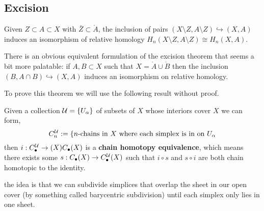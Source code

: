 \documentclass[a4paper]{article}
\begin{document}

\subsection{Excision}

\begin{theorem}[Excision]
    Given $Z\subset A \subset X$ with $\bar{Z}\subset \mathring{A}$, the inclusion of pairs $(X\setminus Z,A\setminus Z)\hookrightarrow (X,A)$ induces an isomorphism of relative homology $H_n(X\setminus Z,A\setminus Z)\cong H_n(X,A)$.
\end{theorem}
There is an obvious equivalent formulation of the excision theorem that seems a bit more palatable: if $A,B\subset X$ such that $X=\mathring{A}\cup\mathring{B}$ then the inclusion $(B,A\cap B)\hookrightarrow (X,A)$ induces an isomorphism on relative homology.

To prove this theorem we will use the following result without proof.
\begin{proposition}
    Given a collection $\mathcal{U}=\{U_\alpha\}$ of subsets of $X$ whose interiors cover $X$ we can form,\[
        C_n^{\mathcal{U}}:=\{\text{$n$-chains in  $X$ where each simplex is in on $U_\alpha$}
    \] then $i:C_\bullet^{\mathcal{U}}\rightarrow(X) C_\bullet(X)$ is a \textbf{chain homotopy equivalence}, which means there exists some $s:C_\bullet(X)\rightarrow C_\bullet^{\mathcal{U}}(X)$ such that $i\circ s$ and $s\circ i$ are both chain homotopic to the identity.
\end{proposition}
the idea is that we can subdivide simplices that overlap the sheet in our open cover (by something called barycentric subdivision) until each simplex only lies in one sheet.
\end{document}
